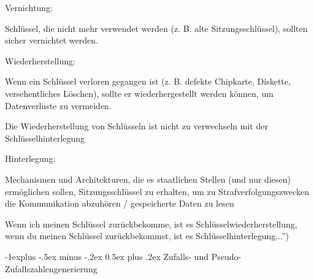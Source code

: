 \documentclass[a4paper]{article}
\makeatletter
\renewcommand{\subsection}{\@startsection{subsection}{2}{0mm}%
 {-1explus -.5ex minus -.2ex}%
 {0.5ex plus .2ex}%
 {\normalfont\normalsize\bfseries}}
\makeatother
\begin{document}
\begin{multicols}{3}
\begin{itemize*}
\begin{itemize*}
            \end{itemize*}
            \item Vernichtung:
            \begin{itemize*}
                  \item Schlüssel, die nicht mehr verwendet werden (z. B. alte Sitzungsschlüssel), sollten sicher vernichtet werden.
            \end{itemize*}
            \item Wiederherstellung:
            \begin{itemize*}
                  \item Wenn ein Schlüssel verloren gegangen ist (z. B. defekte Chipkarte, Diskette, versehentliches Löschen), sollte er wiederhergestellt werden können, um Datenverluste zu vermeiden.
                  \item Die Wiederherstellung von Schlüsseln ist nicht zu verwechseln mit der Schlüsselhinterlegung
            \end{itemize*}
            \item Hinterlegung:
            \begin{itemize*}
                  \item Mechanismen und Architekturen, die es staatlichen Stellen (und nur diesen) ermöglichen sollen, Sitzungsschlüssel zu erhalten, um zu Strafverfolgungszwecken die Kommunikation abzuhören / gespeicherte Daten zu lesen
                  \begin{itemize*} \item Wenn ich meinen Schlüssel zurückbekomme, ist es Schlüsselwiederherstellung, wenn du meinen Schlüssel zurückbekommst, ist es Schlüsselhinterlegung...'') \end{itemize*}
            \end{itemize*}
      \end{itemize*}


      \subsection{Zufalls- und
            Pseudo-Zufallszahlengenerierung}


\end{multicols}
\end{document}
